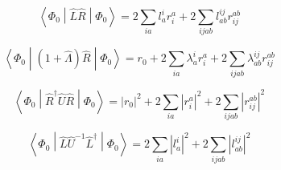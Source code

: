 \documentclass{article}
\begin{document}
\begin{equation}
  \left<\Phi_0\middle|\hat{L}\hat{R}\middle|\Phi_0\right> = 2\sum_{ia}l_a^ir_i^a + 2\sum_{ijab}l_{ab}^{ij}r_{ij}^{ab}
\end{equation}

\begin{equation}
  \left<\Phi_0\middle|\left(1 + \hat{\Lambda}\right)\hat{R}\middle|\Phi_0\right> = r_0 + 2\sum_{ia}\lambda_a^ir_i^a + 2\sum_{ijab}\lambda_{ab}^{ij}r_{ij}^{ab}
\end{equation}

\begin{equation}
  \left<\Phi_0\middle|\hat{R}^\dagger\hat{U}\hat{R}\middle|\Phi_0\right> = \left|r_0\right|^2 + 2\sum_{ia}\left|r_i^a\right|^2 + 2\sum_{ijab}\left|r_{ij}^{ab}\right|^2
\end{equation}

\begin{equation}
  \left<\Phi_0\middle|\hat{L}\hat{U}^{-1}\hat{L}^\dagger\middle|\Phi_0\right> = 2\sum_{ia}\left|l_a^i\right|^2 + 2\sum_{ijab}\left|l_{ab}^{ij}\right|^2
\end{equation}
\end{document}
